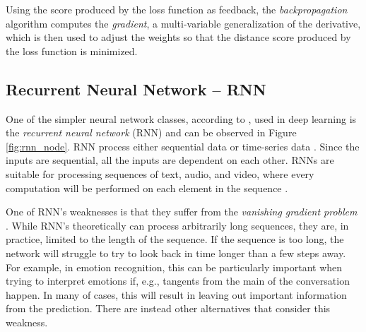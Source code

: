 \documentclass[nofilelist]{cslthse-msc}
\begin{document}
Using the score produced by the loss function as feedback, the \textit{backpropagation} algorithm computes the \textit{gradient}, a multi-variable generalization of the derivative, which is then used to adjust the weights so that the distance score produced by the loss function is minimized. 


\subsection{Recurrent Neural Network -- RNN}

One of the simpler neural network classes, according to \citet{Sherstinsky_2020}, used in deep learning is the \emph{recurrent neural network} (RNN) \citep{Rumelhart1986LearningRB} and can be observed in Figure \ref{fig:rnn_node}. RNN process either sequential data or time-series data \citep{lipton2015critical}. Since the inputs are sequential, all the inputs are dependent on each other. RNNs are suitable for processing sequences of text, audio, and video, where every computation will be performed on each element in the sequence \citep{Sherstinsky_2020}.

One of RNN's weaknesses is that they suffer from the \textit{vanishing gradient problem} \citep{hochreiter1998}. While RNN's theoretically can process arbitrarily long sequences, they are, in practice, limited to the length of the sequence. If the sequence is too long, the network will struggle to try to look back in time longer than a few steps away. For example, in emotion recognition, this can be particularly important when trying to interpret emotions if, e.g., tangents from the main of the conversation happen. In many of cases, this will result in leaving out important information from the prediction. There are instead other alternatives that consider this weakness. 




 
\end{document}
